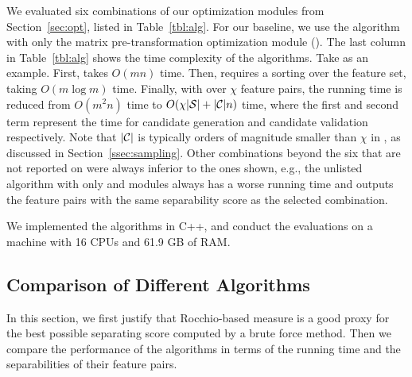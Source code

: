 We evaluated six combinations of our optimization modules
from Section~\ref{sec:opt}, listed in Table~\ref{tbl:alg}.
For our baseline, we use the algorithm
with only the matrix pre-transformation optimization module (\trans).
The last column in Table~\ref{tbl:alg} shows the time complexity
of the algorithms. Take \horiz as an example.
First, \trans takes $O(mn)$ time.
Then, \traversal requires a sorting over the feature set, taking $O(m\log m)$ time. Finally, with \sampling over $\chi$ feature pairs,
the running time is reduced from $O(m^2n)$ time to $O(\chi|{\mathcal{S}}|+|{\mathcal{C}}|n)$ time, where the first and second term represent the time for candidate generation and candidate validation respectively. Note that $|{\mathcal{C}}|$ is typically orders of magnitude smaller than $\chi$ in \horiz, as discussed in Section~\ref{ssec:sampling}.
Other combinations beyond the six that are not reported on were always
inferior to the ones shown, e.g.,
the unlisted algorithm with only \trans and \earlyT modules
always has a worse running time and
outputs the \topk feature pairs with the same separability score as the selected \earlyOrder combination.

 We implemented the algorithms in C++, and conduct the evaluations on a machine with 16 CPUs and 61.9 GB of RAM.

\subsection{Comparison of Different Algorithms}
\label{sec:exp_comp}

In this section, we first
justify that Rocchio-based measure
is a good proxy for the best possible separating score
computed by a brute force method.
Then we compare the performance of the
algorithms in terms of the
running time and the separabilities of their \topthousand feature pairs.

